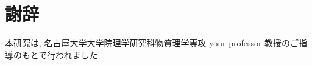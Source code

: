 \documentclass[../thesis]{subfiles}
\begin{document}
\chapter*{謝辞}

本研究は, 名古屋大学大学院理学研究科物質理学専攻 your professor 教授のご指導のもとで行われました.
\end{document}
